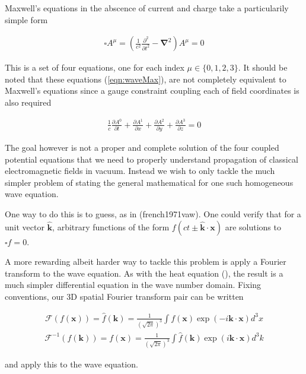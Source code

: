\documentclass[]{eliblog}
\newcommand{\Bk}[0]{\mathbf{k}}
\newcommand{\Bx}[0]{\mathbf{x}}
\newcommand{\spacegrad}[0]{\boldsymbol{\nabla}}
\newcommand{\delambertian}[0]{\square}
\newcommand{\inv}[1]{\frac{1}{#1}}
\newcommand{\FF}[0]{\mathcal{F}}
\newcommand{\kcap}[0]{\hat{\Bk}}
\begin{document}
Maxwell's equations in the abscence of current and charge take a particularily simple form

\begin{align}\label{eqn:waveMax}
\delambertian A^\mu = \left( \frac{1}{c^2}\frac{\partial^2}{{\partial t}^2} - \spacegrad^2 \right) A^\mu = 0
\end{align}

This is a set of four equations, one for each index $\mu \in \{0,1,2,3\}$.  It should be noted
that these equations (\ref{eqn:waveMax}), are not completely 
equivalent to Maxwell's equations since a gauge constraint coupling each of field coordinates is also required

\begin{align}
\inv{c}\frac{\partial A^0}{\partial t}
+ \frac{\partial A^1}{\partial x}
+ \frac{\partial A^2}{\partial y}
+ \frac{\partial A^3}{\partial z}
= 0
\end{align}

The goal however is not a proper and complete solution of the four coupled potential equations that we need
to properly understand propagation of classical electromagnetic fields in vacuum.
Instead we wish to only tackle the much simpler problem of stating the general mathematical for one such homogeneous
wave equation.

One way to do this is to guess, as in ({french1971vaw}).   
One could verify that for a unit vector $\kcap$, arbitrary
functions of the form $f(ct \pm \kcap \cdot \Bx)$ are solutions to $\delambertian f = 0$.

A more rewarding albeit harder way to tackle this problem is apply a Fourier transform to the wave equation.  As with the heat equation
(\cite{osgoodFourier}), the result is a much simpler differential equation in the wave number domain.
Fixing conventions, our 3D spatial Fourier transform pair can be written

\begin{align}
\FF(f(\Bx)) = \hat{f}(\Bk) = \inv{(\sqrt{2\pi})^3} \int f(\Bx) \exp\left( -i \Bk \cdot \Bx \right) d^3 x 
\end{align}
\begin{align}
\FF^{-1}({f}(\Bk)) = f(\Bx) = \inv{(\sqrt{2\pi})^3} \int \hat{f}(\Bk) \exp\left( i \Bk \cdot \Bx \right) d^3 k
\end{align}

and apply this to the wave equation.

%
%
\end{document}
